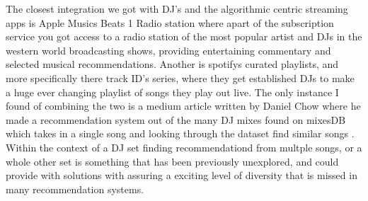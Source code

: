 The closest integration we got with DJ's and the algorithmic centric streaming apps is Apple Musics Beats 1 Radio station where apart of the subscription service you got access to a radio station of the most popular artist and DJs in the western world broadcasting shows, providing entertaining commentary and selected musical recommendations. Another is spotifys curated playlists, and more specifically there track ID's series, where they get established DJs to make a huge ever changing playlist of songs they play out live. The only instance I found of combining the two is a medium article written by Daniel Chow where he made a recommendation system out of the many DJ mixes found on mixesDB which takes in a single song and looking through the dataset find similar songs \citep{chow_music_2020}. Within the context of a DJ set finding recommendationd from multple songs, or a whole other set is something that has been previously unexplored, and could provide with solutions with assuring a exciting level of diversity that is missed in many recommendation systems.

